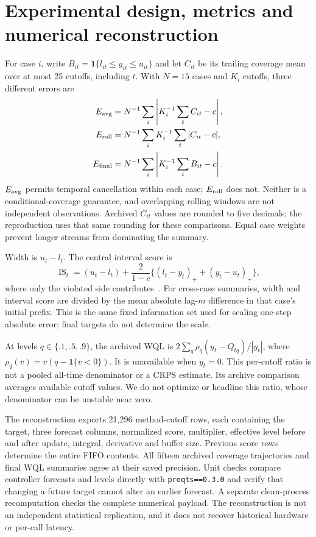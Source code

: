 \documentclass[11pt,a4paper]{article}
\begin{document}
\section{Experimental design, metrics and numerical reconstruction}
For case $i$, write $B_{it}=\mathbf1\{l_{it}\le y_{it}\le u_{it}\}$ and let $C_{it}$ be its trailing coverage mean over at most 25 cutoffs, including $t$. With $N=15$ cases and $K_i$ cutoffs, three different errors are
\begin{align}
E_{\rm avg}&=N^{-1}\sum_i\left|K_i^{-1}\sum_t C_{it}-c\right|,\\
E_{\rm roll}&=N^{-1}\sum_i K_i^{-1}\sum_t|C_{it}-c|,\\
E_{\rm final}&=N^{-1}\sum_i\left|K_i^{-1}\sum_t B_{it}-c\right|.
\end{align}
$E_{\rm avg}$ permits temporal cancellation within each case; $E_{\rm roll}$ does not. Neither is a conditional-coverage guarantee, and overlapping rolling windows are not independent observations. Archived $C_{it}$ values are rounded to five decimals; the reproduction uses that same rounding for these comparisons. Equal case weights prevent longer streams from dominating the summary.

Width is $u_t-l_t$. The central interval score is
\begin{equation}
\operatorname{IS}_t=(u_t-l_t)+\frac{2}{1-c}\{(l_t-y_t)_+ +(y_t-u_t)_+\},
\end{equation}
where only the violated side contributes~\cite{gneiting2007}. For cross-case summaries, width and interval score are divided by the mean absolute lag-$m$ difference in that case's initial prefix. This is the same fixed information set used for scaling one-step absolute error; final targets do not determine the scale.

At levels $q\in\{.1,.5,.9\}$, the archived WQL is $2\sum_q\rho_q(y_t-Q_{tq})/|y_t|$, where $\rho_q(v)=v(q-\mathbf1\{v<0\})$. It is unavailable when $y_t=0$. This per-cutoff ratio is not a pooled all-time denominator or a CRPS estimate. Its archive comparison averages available cutoff values. We do not optimize or headline this ratio, whose denominator can be unstable near zero.

The reconstruction exports 21,296 method-cutoff rows, each containing the target, three forecast columns, normalized score, multiplier, effective level before and after update, integral, derivative and buffer size. Previous score rows determine the entire FIFO contents. All fifteen archived coverage trajectories and final WQL summaries agree at their saved precision. Unit checks compare controller forecasts and levels directly with \texttt{preqts==0.3.0} and verify that changing a future target cannot alter an earlier forecast. A separate clean-process recomputation checks the complete numerical payload. The reconstruction is not an independent statistical replication, and it does not recover historical hardware or per-call latency.
\end{document}
